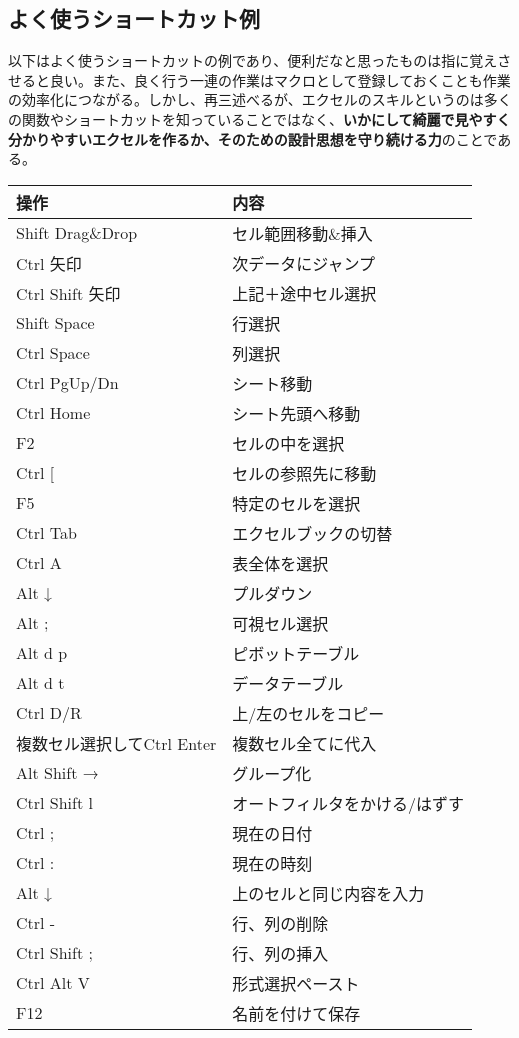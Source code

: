 \documentclass[dvipdfmx]{jsarticle}
\begin{document}
\subsection{よく使うショートカット例}
以下はよく使うショートカットの例であり、便利だなと思ったものは指に覚えさせると良い。また、良く行う一連の作業はマクロとして登録しておくことも作業の効率化につながる。しかし、再三述べるが、エクセルのスキルというのは多くの関数やショートカットを知っていることではなく、\textbf{いかにして綺麗で見やすく分かりやすいエクセルを作るか、そのための設計思想を守り続ける力}のことである。
\begin{center}
  \begin{tabular}{ll} \toprule
操作 & 内容 \\ \midrule
Shift Drag\&Drop	& セル範囲移動\&挿入\\
Ctrl 矢印 & 次データにジャンプ\\
Ctrl Shift 矢印 & 上記＋途中セル選択\\
Shift Space & 行選択\\
Ctrl Space & 列選択\\
Ctrl PgUp/Dn & シート移動\\
Ctrl Home & シート先頭へ移動\\
F2 & セルの中を選択\\
Ctrl [ & セルの参照先に移動\\
F5 & 特定のセルを選択\\
Ctrl Tab & エクセルブックの切替\\
Ctrl A & 表全体を選択\\
Alt ↓ & プルダウン\\
Alt ; & 可視セル選択\\
Alt d p & ピボットテーブル\\
Alt d t & データテーブル\\
Ctrl D/R & 上/左のセルをコピー\\
複数セル選択してCtrl Enter & 複数セル全てに代入\\
Alt Shift → & グループ化\\
Ctrl Shift l & オートフィルタをかける/はずす\\
Ctrl ; & 現在の日付\\
Ctrl : & 現在の時刻\\
Alt ↓ & 上のセルと同じ内容を入力\\
Ctrl - & 行、列の削除\\
Ctrl Shift ; & 行、列の挿入\\
Ctrl Alt V & 形式選択ペースト\\
F12 & 名前を付けて保存\\

\end{tabular}
\end{center}
\end{document}
